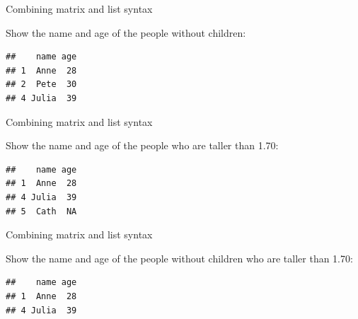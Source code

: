\documentclass[ignorenonframetext,]{beamer}
\newenvironment{Shaded}{\begin{snugshade}}{\end{snugshade}}
\newcommand{\FloatTok}[1]{\textcolor[rgb]{0.00,0.00,0.81}{#1}}
\newcommand{\KeywordTok}[1]{\textcolor[rgb]{0.13,0.29,0.53}{\textbf{#1}}}
\newcommand{\NormalTok}[1]{#1}
\newcommand{\OperatorTok}[1]{\textcolor[rgb]{0.81,0.36,0.00}{\textbf{#1}}}
\newcommand{\OtherTok}[1]{\textcolor[rgb]{0.56,0.35,0.01}{#1}}
\newcommand{\StringTok}[1]{\textcolor[rgb]{0.31,0.60,0.02}{#1}}
\begin{document}
\begin{frame}[fragile]{Combining matrix and list syntax}
\protect\hypertarget{combining-matrix-and-list-syntax}{}

Show the name and age of the people without children:

\begin{Shaded}
\end{Shaded}

\begin{verbatim}
##    name age
## 1  Anne  28
## 2  Pete  30
## 4 Julia  39
\end{verbatim}

\end{frame}

\begin{frame}[fragile]{Combining matrix and list syntax}
\protect\hypertarget{combining-matrix-and-list-syntax-1}{}

Show the name and age of the people who are taller than 1.70:

\begin{Shaded}
\end{Shaded}

\begin{verbatim}
##    name age
## 1  Anne  28
## 4 Julia  39
## 5  Cath  NA
\end{verbatim}

\end{frame}

\begin{frame}[fragile]{Combining matrix and list syntax}
\protect\hypertarget{combining-matrix-and-list-syntax-2}{}

Show the name and age of the people without children who are taller than
1.70:

\begin{Shaded}
\end{Shaded}

\begin{verbatim}
##    name age
## 1  Anne  28
## 4 Julia  39
\end{verbatim}

\end{frame}
\end{document}
